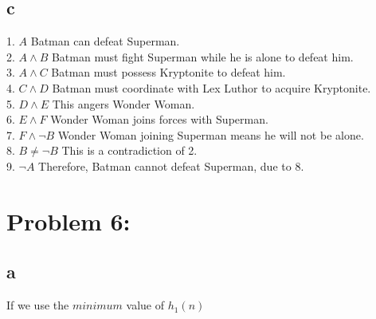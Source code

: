 \documentclass[11pt, oneside]{article}   	%
\begin{document}
\begin{flushleft}
\subsection*{c}
1. $A$ Batman can defeat Superman. \\
2. $A \wedge B$ Batman must fight Superman while he is alone to defeat him. \\
3. $A \wedge C$ Batman must possess Kryptonite to defeat him. \\
4. $C \wedge D$ Batman must coordinate with Lex Luthor to acquire Kryptonite. \\
5. $D \wedge E$ This angers Wonder Woman. \\
6. $E \wedge F$ Wonder Woman joins forces with Superman. \\
7. $F \wedge \neg B$ Wonder Woman joining Superman means he will not be alone. \\
8. $B \neq \neg B$ This is a contradiction of 2. \\
9. $\neg A$ Therefore, Batman cannot defeat Superman, due to 8.\\\medskip

\section*{Problem 6:}
\subsection*{a}
If we use the $minimum$ value of $h_{1}(n)$

\end{flushleft}
\end{document}
